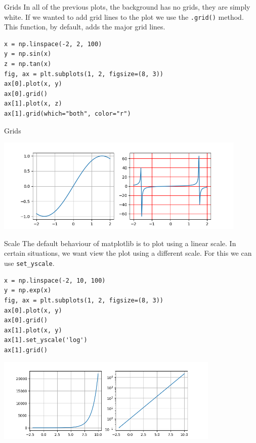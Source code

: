 \documentclass[10pt]{beamer}
\begin{document}
\begin{frame}[label={sec:org353563e},fragile]{Grids}
 In all of the previous plots, the background has no grids, they are simply
white. If we wanted to add grid lines to the plot we use the \texttt{.grid()}
method. This function, by default, adds the major grid lines.

\begin{verbatim}
x = np.linspace(-2, 2, 100)
y = np.sin(x)
z = np.tan(x)
fig, ax = plt.subplots(1, 2, figsize=(8, 3))
ax[0].plot(x, y)
ax[0].grid()
ax[1].plot(x, z)
ax[1].grid(which="both", color="r")
\end{verbatim}
\end{frame}

\begin{frame}[label={sec:org2028ac5}]{Grids}
\begin{center}
\includegraphics[width=0.9\textwidth]{images/grids.png}
\end{center}
\end{frame}

\begin{frame}[label={sec:orgb000d9e},fragile]{Scale}
 The default behaviour of matplotlib is to plot using a linear scale. In certain
situations, we want view the plot using a different scale. For this we can use \texttt{set\_yscale}.

\begin{verbatim}
x = np.linspace(-2, 10, 100)
y = np.exp(x)
fig, ax = plt.subplots(1, 2, figsize=(8, 3))
ax[0].plot(x, y)
ax[0].grid()
ax[1].plot(x, y)
ax[1].set_yscale('log')
ax[1].grid()
\end{verbatim}

\begin{center}
\includegraphics[width=0.8\textwidth]{images/scale.png}
\end{center}
\end{frame}
\end{document}
